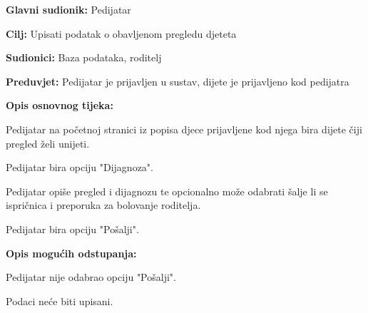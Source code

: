 					\noindent {}
					\begin{packed_item}
						
						\item \textbf{Glavni sudionik: }Pedijatar
						\item  \textbf{Cilj:} Upisati podatak o obavljenom pregledu djeteta
						\item  \textbf{Sudionici:} Baza podataka, roditelj
						\item  \textbf{Preduvjet:} Pedijatar je prijavljen u sustav, dijete je prijavljeno kod pedijatra
						\item  \textbf{Opis osnovnog tijeka:}
						
						\item[] \begin{packed_enum}
							
							\item Pedijatar na početnoj stranici iz popisa djece prijavljene kod njega bira dijete čiji pregled želi unijeti.
							\item Pedijatar bira opciju "Dijagnoza".
							\item Pedijatar opiše pregled i dijagnozu te opcionalno može odabrati šalje li se ispričnica i preporuka za bolovanje roditelja.
							\item Pedijatar bira opciju "Pošalji".
						\end{packed_enum}
						
						\item  \textbf{Opis mogućih odstupanja:}
						
						\item[] \begin{packed_item}
							
							\item[4.a] Pedijatar nije odabrao opciju "Pošalji".
							\item[] \begin{packed_enum}
								
								\item Podaci neće biti upisani.
							\end{packed_enum}
							
							
						\end{packed_item}
						
						
					\end{packed_item}
					
